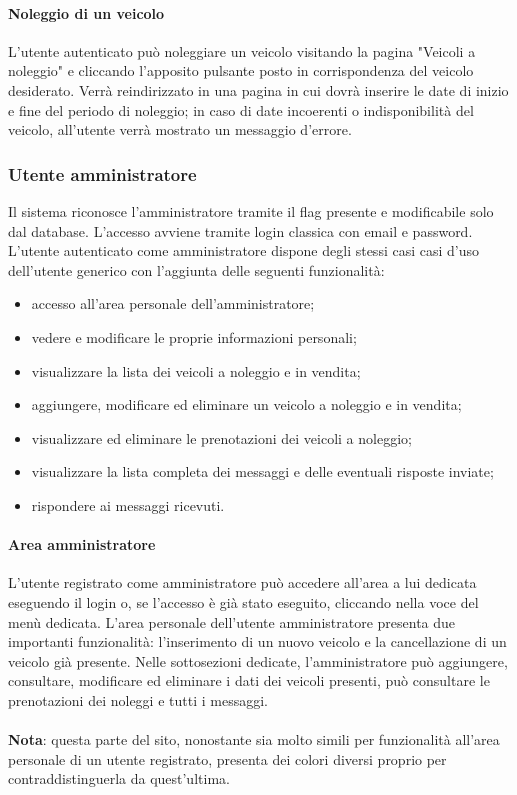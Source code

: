         \paragraph{Noleggio di un veicolo}
        L'utente autenticato può noleggiare un veicolo visitando la pagina "Veicoli a noleggio" e cliccando l'apposito pulsante posto in corrispondenza del veicolo desiderato. Verrà reindirizzato in una pagina in cui dovrà inserire le date di inizio e fine del periodo di noleggio; in caso di date incoerenti o indisponibilità del veicolo, all'utente verrà mostrato un messaggio d'errore.

        \subsubsection{Utente amministratore}
        Il sistema riconosce l’amministratore tramite il flag presente e modificabile solo dal database.
        L’accesso avviene tramite login classica con email e password.
        L’utente autenticato come amministratore dispone degli stessi casi casi d’uso dell'utente generico con l'aggiunta delle seguenti funzionalità:
        \begin{itemize}
            \item accesso all'area personale dell'amministratore;
            \item vedere e modificare le proprie informazioni personali;
            \item visualizzare la lista dei veicoli a noleggio e in vendita;
            \item aggiungere, modificare ed eliminare un veicolo a noleggio e in vendita;
            \item visualizzare ed eliminare le prenotazioni dei veicoli a noleggio;
            \item visualizzare la lista completa dei messaggi e delle eventuali risposte inviate;
            \item rispondere ai messaggi ricevuti.
        \end{itemize}

        \paragraph{Area amministratore} L'utente registrato come amministratore può accedere all'area a lui dedicata eseguendo il login o, se l'accesso è già stato eseguito, cliccando nella voce del menù dedicata. L'area personale dell'utente amministratore presenta due importanti funzionalità: l'inserimento di un nuovo veicolo e la cancellazione di un veicolo già presente. Nelle sottosezioni dedicate, l'amministratore può aggiungere, consultare, modificare ed eliminare i dati dei veicoli presenti, può consultare le prenotazioni dei noleggi e tutti i messaggi.\\
        \\
        \textbf{Nota}: questa parte del sito, nonostante sia molto simili per funzionalità all'area personale di un utente registrato, presenta dei colori diversi proprio per contraddistinguerla da quest'ultima.  
\pagebreak
